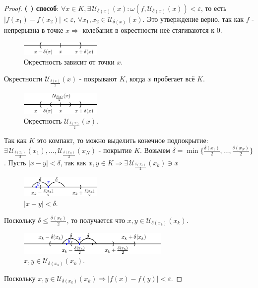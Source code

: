 \documentclass[12pt]{article}
\newcommand{\RN}[1]{%
	\textup{\uppercase\expandafter{\romannumeral#1}}%
}
\newcommand{\MU}{\mathcal{U}}
\newcommand{\VE}{\varepsilon}
\theoremstyle{definition}
\begin{document}
\begin{proof}
	\textbf{(\RN{2}) способ}: $\forall x \in K, \exists \, \MU_{\delta(x)}(x) \colon \omega(f, \MU_{\delta(x)}(x)) < \VE$, то есть $|f(x_1) - f(x_2)| < \VE, \, \forall x_1,x_2 \in \MU_{\delta(x)}(x)$. Это утверждение верно, так как $f$ - непрерывна в точке $x \Rightarrow$ колебания в окрестности неё стягиваются к $0$.
	\begin{figure}[H]
		\centering
		\includegraphics[width=0.35\textwidth]{20_1.eps}
		\caption{Окрестность зависит от точки $x$.}
		\label{20_1}
	\end{figure}
	Окрестности $\MU_{\frac{\delta(x)}{2}}(x)$ - покрывают $K$, когда $x$ пробегает всё $K$.
	\begin{figure}[H]
		\centering
		\includegraphics[width=0.35\textwidth]{20_2.eps}
		\caption{Окрестность $\MU_{\frac{\delta(x)}{2}}(x)$.}
		\label{20_2}
	\end{figure}
	Так как $K$ это компакт, то можно выделить конечное подпокрытие: $\exists \, \MU_{\frac{\delta(x_1)}{2}}(x_1), \dotsc , \MU_{\frac{\delta(x_N)}{2}}(x_N)$ - покрытие $K$. Возьмем $\delta = \min\big\{\frac{\delta(x_1)}{2}, \dotsc,\frac{\delta(x_N)}{2} \big\}$. Пусть $|x-y| < \delta$, так как $x,y \in K \Rightarrow \exists \, \MU_{\frac{\delta(x_k)}{2}}(x_k) \ni x$
	\begin{figure}[H]
		\centering
		\includegraphics[width=0.35\textwidth]{20_3.eps}
		\caption{$|x-y| < \delta$.}
		\label{20_3}
	\end{figure}
	Поскольку $\delta \leq \frac{\delta(x_k)}{2}$, то получается что $x,y \in \MU_{\delta(x_k)}(x_k)$.
	\begin{figure}[H]
		\centering
		\includegraphics[width=0.65\textwidth]{20_4.eps}
		\caption{$x,y \in \MU_{\delta(x_k)}(x_k)$.}
		\label{20_4}
	\end{figure}
	Поскольку $x,y \in \MU_{\delta(x_k)}(x_k) \Rightarrow |f(x) - f(y)| < \VE$.
	
\end{proof}
\end{document}

